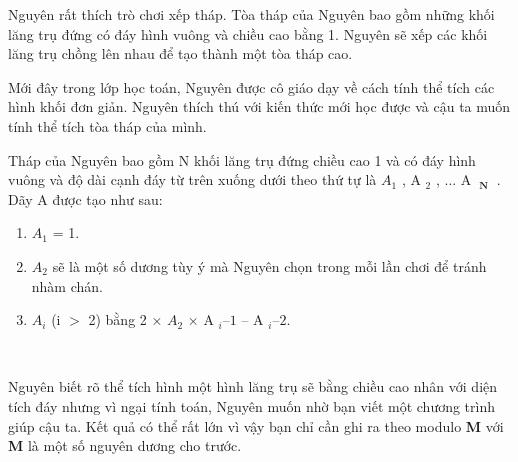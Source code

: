 Nguyên rất thích trò chơi xếp tháp. Tòa tháp của Nguyên bao gồm những khối lăng trụ đứng có đáy hình vuông và chiều cao bằng 1. Nguyên sẽ xếp các khối lăng trụ chồng lên nhau để tạo thành một tòa tháp cao.

Mới đây trong lớp học toán, Nguyên được cô giáo dạy về cách tính thể tích các hình khối đơn giản. Nguyên thích thú với kiến thức mới học được và cậu ta muốn tính thể tích tòa tháp của mình.

Tháp của Nguyên bao gồm N khối lăng trụ đứng chiều cao 1 và có đáy hình vuông và độ dài cạnh đáy từ trên xuống dưới theo thứ tự là $A_{1}$ , A­­­ $_ 2 $ , ... A­­ $_\textbf{ N }$ . Dãy A được tạo như sau:
\begin{enumerate}
	\item $A_{1}$ = 1.
	\item $A_{2}$ sẽ là một số dương tùy ý mà Nguyên chọn trong mỗi lần chơi để tránh nhàm chán.
	\item $A_{i}$ (i $>$ 2) bằng 2 × $A_{2}$ × A $_ i  – 1 $ – A­ $_ i – 2. $
\end{enumerate}

 

Nguyên biết rõ thể tích hình một hình lăng trụ sẽ bằng chiều cao nhân với diện tích đáy nhưng vì ngại tính toán, Nguyên muốn nhờ bạn viết một chương trình giúp cậu ta. Kết quả có thể rất lớn vì vậy bạn chỉ cần ghi ra theo modulo \textbf{ M } với \textbf{ M } là một số nguyên dương cho trước.